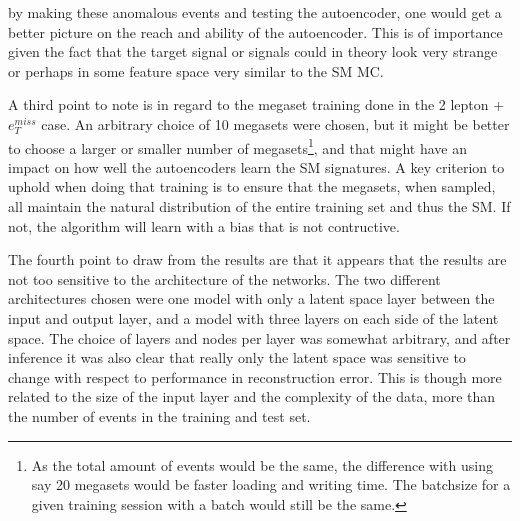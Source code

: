 by making these anomalous events and testing the autoencoder, one would get a better 
picture on the reach and ability of the autoencoder. This is of importance given the 
fact that the target signal or signals could in theory look very strange or perhaps 
in some feature space very similar to the SM MC. \par 
A third point to note is in regard to the megaset training done in the 2 lepton + 
$e_T^{miss}$ case. An arbitrary choice of 10 megasets were chosen, but it might 
be better to choose a larger or smaller number of megasets\footnote{As the total 
amount of events would be the same, the difference with using say 20 megasets would 
be faster loading and writing time. The batchsize for a given training session with a batch 
would still be the same. }, and that might have an impact
on how well the autoencoders learn the SM signatures. A key criterion to uphold when 
doing that training is to ensure that the megasets, when sampled, all maintain the natural distribution of 
the entire training set and thus the SM. If not, the algorithm will learn
with a bias that is not contructive. \par 
The fourth point to draw from the results are that it appears that the results are not 
too sensitive to the architecture of the networks. The two different architectures chosen
were one model with only a latent space layer between the input and output layer, and a model
with three layers on each side of the latent space. The choice of layers and nodes per layer 
was somewhat arbitrary, and after inference it was also clear that really only the latent space
was sensitive to change with respect to performance in reconstruction error. This is though 
more related to the size of the input layer and the complexity of the data, more than 
the number of events in the training and test set. 